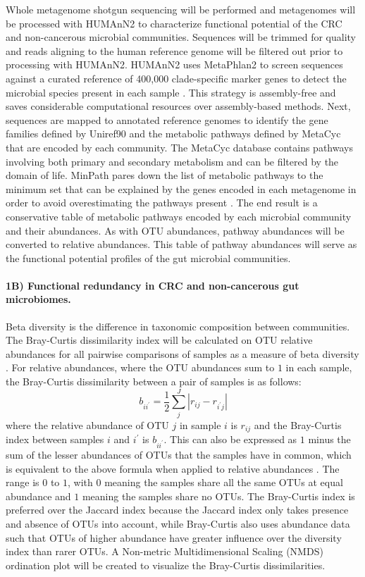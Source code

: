 \documentclass[11pt]{article}
\begin{document}
Whole metagenome shotgun sequencing will be performed and metagenomes will be processed with HUMAnN2 \cite{franzosa_species-level_2018} to characterize functional potential of the CRC and non-cancerous microbial communities.
Sequences will be trimmed for quality and reads aligning to the human reference genome will be filtered out prior to processing with HUMAnN2.
HUMAnN2 uses MetaPhlan2 to screen sequences against a curated reference of 400,000 clade-specific marker genes to detect the microbial species present in each sample \cite{segata_metagenomic_2012}.
This strategy is assembly-free and saves considerable computational resources over assembly-based methods.
Next, sequences are mapped to annotated reference genomes to identify the gene families defined by Uniref90 and the metabolic pathways defined by MetaCyc \cite{caspi_metacyc_2018} that are encoded by each community.
The MetaCyc database contains pathways involving both primary and secondary metabolism and can be filtered by the domain of life.
MinPath pares down the list of metabolic pathways to the minimum set that can be explained by the genes encoded in each metagenome in order to avoid overestimating the pathways present \cite{ye_parsimony_2009}.
The end result is a conservative table of metabolic pathways encoded by each microbial community and their abundances.
As with OTU abundances, pathway abundances will be converted to relative abundances.
This table of pathway abundances will serve as the functional potential profiles of the gut microbial communities.

\paragraph{1B) Functional redundancy in CRC and non-cancerous gut microbiomes.}

Beta diversity is the difference in taxonomic composition between communities.
The Bray-Curtis dissimilarity index will be calculated on OTU relative abundances for all pairwise comparisons of samples as a measure of beta diversity \cite{bray_ordination_1957}.
For relative abundances, where the OTU abundances sum to $1$ in each sample, the Bray-Curtis dissimilarity between a pair of samples is as follows:
$$b_{i i^\prime } = \frac{1}{2} \sum_{j}^J | r_{ij} - r_{i^\prime j} |$$
where the relative abundance of OTU $j$ in sample $i$ is $r_{ij}$ and the Bray-Curtis index between samples $i$ and $i^\prime$ is $b_{i i^\prime }$.
This can also be expressed as $1$ minus the sum of the lesser abundances of OTUs that the samples have in common, which is equivalent to the above formula when applied to relative abundances \cite{greenacre_multivariate_2014}.
The range is $0$ to $1$, with $0$ meaning the samples share all the same OTUs at equal abundance and $1$ meaning the samples share no OTUs.
The Bray-Curtis index is preferred over the Jaccard index because the Jaccard index only takes presence and absence of OTUs into account, while Bray-Curtis also uses abundance data such that OTUs of higher abundance have greater influence over the diversity index than rarer OTUs.
A Non-metric Multidimensional Scaling (NMDS) ordination plot will be created to visualize the Bray-Curtis dissimilarities.
\end{document}
